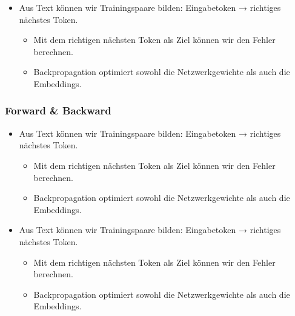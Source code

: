 \begin{frame}[t]
\begin{itemize}
\item Aus Text können wir Trainingspaare bilden: Eingabetoken → richtiges nächstes Token.
\begin{itemize}
\item Mit dem richtigen nächsten Token als Ziel können wir den Fehler berechnen.
\item Backpropagation optimiert sowohl die Netzwerkgewichte als auch die Embeddings.
\end{itemize}
\end{itemize}
\end{frame}

\begin{frame}[t]
\frametitle{Forward \& Backward}

\begin{itemize}
\item Aus Text können wir Trainingspaare bilden: Eingabetoken → richtiges nächstes Token.
\begin{itemize}
\item Mit dem richtigen nächsten Token als Ziel können wir den Fehler berechnen.
\item Backpropagation optimiert sowohl die Netzwerkgewichte als auch die Embeddings.
\end{itemize}
\end{itemize}
\end{frame}

\begin{frame}[t]

\begin{itemize}
\item Aus Text können wir Trainingspaare bilden: Eingabetoken → richtiges nächstes Token.
\begin{itemize}
\item Mit dem richtigen nächsten Token als Ziel können wir den Fehler berechnen.
\item Backpropagation optimiert sowohl die Netzwerkgewichte als auch die Embeddings.
\end{itemize}
\end{itemize}
\end{frame}


